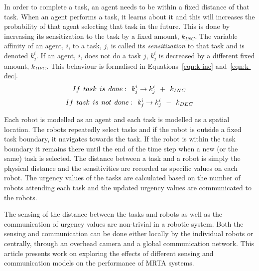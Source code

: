 \documentclass[journal]{IEEEtran}
\begin{document}
In order to complete a task, an agent needs to be within a fixed distance of that task.  When an agent performs a task, it learns about it and this will increases the probability of that agent selecting that task in the future.  This is done by increasing its sensitization to the task by a fixed amount, $k_{INC}$. The variable affinity of an agent, $i$, to a task, $j$, is called its {\em sensitization} to that task and is denoted $k^{i}_{j}$.  If an agent, $i$, does not do a task $j$, $k^i_j$ is decreased by a different fixed amount, $k_{DEC}$.  This behaviour is formalised in Equations~\ref{eqn:k-inc} and~\ref{eqn:k-dec}.
\begin{equation}
 If\hspace*{0.15cm}task\hspace*{0.15cm}is\hspace*{0.15cm}done:\hspace*{0.15cm}  k^i_j \rightarrow   k^i_j \hspace*{0.15cm} + \hspace*{0.15cm} k_{INC}
\label{eqn:k-inc}
\end{equation}
\begin{equation}
 If\hspace*{0.15cm}task\hspace*{0.15cm}is\hspace*{0.15cm}not\hspace*{0.15cm}done:\hspace*{0.15cm}  k^i_j \rightarrow   k^i_j \hspace*{0.15cm} - \hspace*{0.15cm} k_{DEC}
\label{eqn:k-dec}
\end{equation}

Each robot is modelled as an agent and each task is modelled as a spatial location.  The robots repeatedly select tasks and if the robot is outside a fixed task boundary, it navigates towards the task.  If the robot is within the task boundary it remains there until the end of the time step when a new (or the same) task is selected.
The distance between a task and a robot is simply the physical distance and the sensitivities are recorded as specific values on each robot.
The urgency values of the tasks are calculated based on the number of robots attending each task and the updated urgency values are communicated to the robots.

The sensing of the distance between the tasks and robots as well as the communication of urgency values are non-trivial in a robotic system.  Both the sensing and communication can be done either locally by the individual robots or centrally, through an overhead camera and a global communication network. This article presents work on exploring the effects of different sensing and communication models on the performance of MRTA systems.
\end{document}
